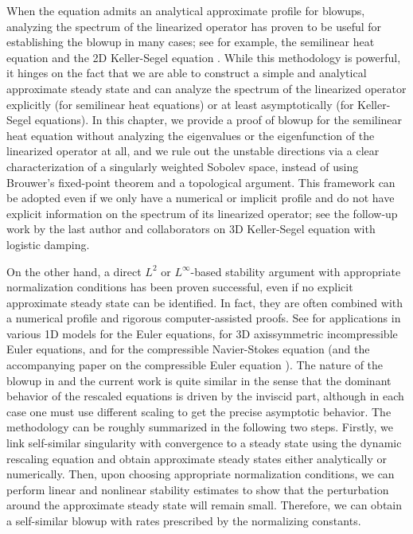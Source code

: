 \documentclass[12pt]{caltech_thesis}
\numberwithin{equation}{section}
\begin{document}
When the equation admits an analytical approximate profile for blowups, analyzing the spectrum of the linearized operator has proven to be useful for establishing the blowup in many cases; see for example, the semilinear heat equation \cite{bricmont1994universality, merle1997stability} and the 2D Keller-Segel equation \cite{raphael2014stability, collot2022refined}. While this methodology is powerful, it hinges on the fact that we are able to construct a simple and analytical approximate steady state and can analyze the spectrum of the linearized operator explicitly (for semilinear heat equations) or at least asymptotically (for Keller-Segel equations). In this chapter, we provide a proof of blowup for the semilinear heat equation without analyzing the eigenvalues or the eigenfunction of the linearized operator at all, and we rule out the unstable directions via a clear characterization of a singularly weighted Sobolev space, instead of using Brouwer's fixed-point theorem and a topological argument. {This framework can be adopted even if we
only have a numerical or implicit profile and do not have explicit information on the
spectrum of its linearized operator; see the follow-up work by the last author and collaborators \cite{liu2025finite} on 3D Keller-Segel equation with logistic damping.} 

On the other hand, a direct $L^2$ \cite{chen2021finite} or $L^\infty$-based \cite{chen2022stable} stability argument with appropriate normalization conditions has been proven successful, even if no explicit approximate steady state can be identified. In fact, they are often combined with a numerical profile and rigorous computer-assisted proofs. See  \cite{chen2021finite, chen2020singularity, hou2024blowup} for applications in various 1D models for the Euler equations, \cite{ chen2019finite2, chen2022stable} for 3D axissymmetric incompressible Euler equations, and { \cite{MRRSam22a} for the compressible Navier-Stokes equation (and the accompanying paper on the compressible Euler equation \cite{MRRSam22b}). The nature of the blowup in \cite{MRRSam22b, MRRSam22a} and the current work is quite similar in the sense that the dominant behavior of the rescaled equations is driven by the inviscid part, although in each case one must use different scaling to get the precise asymptotic behavior.} The methodology can be roughly summarized in the following two steps. Firstly, we link self-similar singularity with convergence to a steady state using the dynamic rescaling equation and obtain approximate steady states either analytically or numerically. Then, upon choosing appropriate normalization conditions, we can perform linear and nonlinear stability estimates to show that the perturbation around the approximate steady state will remain small. Therefore, we can obtain a self-similar blowup with rates prescribed by the normalizing constants.
\end{document}
